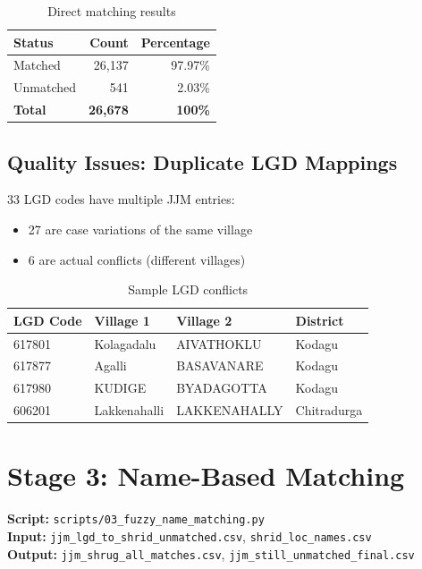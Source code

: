 \documentclass[11pt,a4paper]{article}
\begin{document}
\begin{table}[h]
\centering
\begin{tabular}{lrr}
\toprule
\textbf{Status} & \textbf{Count} & \textbf{Percentage} \\
\midrule
Matched & 26,137 & 97.97\% \\
Unmatched & 541 & 2.03\% \\
\midrule
\textbf{Total} & \textbf{26,678} & \textbf{100\%} \\
\bottomrule
\end{tabular}
\caption{Direct matching results}
\end{table}

\subsection{Quality Issues: Duplicate LGD Mappings}

33 LGD codes have multiple JJM entries:
\begin{itemize}
    \item 27 are case variations of the same village
    \item 6 are actual conflicts (different villages)
\end{itemize}

\begin{table}[h]
\centering
\small
\begin{tabular}{llll}
\toprule
\textbf{LGD Code} & \textbf{Village 1} & \textbf{Village 2} & \textbf{District} \\
\midrule
617801 & Kolagadalu & AIVATHOKLU & Kodagu \\
617877 & Agalli & BASAVANARE & Kodagu \\
617980 & KUDIGE & BYADAGOTTA & Kodagu \\
606201 & Lakkenahalli & LAKKENAHALLY & Chitradurga \\
\bottomrule
\end{tabular}
\caption{Sample LGD conflicts}
\end{table}

\section{Stage 3: Name-Based Matching}

\textbf{Script:} \texttt{scripts/03\_fuzzy\_name\_matching.py}\\
\textbf{Input:} \texttt{jjm\_lgd\_to\_shrid\_unmatched.csv}, \texttt{shrid\_loc\_names.csv}\\
\textbf{Output:} \texttt{jjm\_shrug\_all\_matches.csv}, \texttt{jjm\_still\_unmatched\_final.csv}
\end{document}
